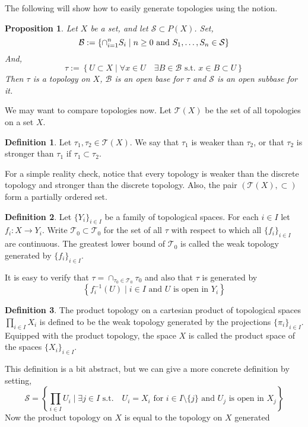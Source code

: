 \documentclass[11pt,a4paper]{article}
\theoremstyle{definition}
\newtheorem{definition}{Definition}[section]
\theoremstyle{plain}
\newtheorem{proposition}[theorem]{Proposition}
\newcommand{\st}{\text{ s.t. }}
\newcommand{\set}[2]{ \left\{ #1 \mid #2 \right\} }
\begin{document}
	The following will show how to easily generate topologies using the notion.
	\begin{proposition}
		Let $X$ be a set, and let $\mathcal{S} \subset P(X)$. Set,
		\[
			\mathcal{B} := \set{\cap_{i=1}^{n}{S_i}}{n \geq 0 \textnormal{ and }
			S_1,\dots,S_n \in \mathcal{S}}
		\]
		And,
		\[
			\tau := \set{U \subset X}{\forall x \in U \quad \exists B \in 
			\mathcal{B} \st x \in B \subset U}
		\]
		Then $\tau$ is a topology on $X$, $\mathcal{B}$ is an open base for 
		$\tau$ and $\mathcal{S}$ is an open subbase for it.
	\end{proposition}
	We may want to compare topologies now. Let $\mathcal{T}(X)$ be the set of
	all topologies on a set $X$.
	\begin{definition}
		Let $\tau_1,\tau_2 \in \mathcal{T}(X)$. We say that $\tau_1$ is weaker
		than $\tau_2$, or that $\tau_2$ is stronger than $\tau_1$ if 
		$\tau_1 \subset \tau_2$.
	\end{definition}
	For a simple reality check, notice that every topology is weaker than the
	discrete topology and stronger than the discrete topology. Also, the
	pair $(\mathcal{T}(X), \subset)$ form a partially ordered set.
	\begin{definition}
		Let $\{Y_i\}_{i \in I}$ be a family of topological spaces. For each
		$i \in I$ let $f_i \colon X \to Y_i$. Write $\mathcal{T}_0 \subset 
		\mathcal{T}_0$ for the set of all $\tau$ with respect to which all
		$\{f_i\}_{i \in I}$ are continuous. The greatest lower bound of 
		$\mathcal{T}_0$ is called the weak topology generated by 
		$\{f_i\}_{i \in I}$.
	\end{definition}
	It is easy to verify that $\tau = \cap_{\tau_0 \in \mathcal{T}_0}{\tau_0}$
	and also that $\tau$ is generated by 
	\[
		\set{f_i^{-1}(U)}{i \in I \text{ and $U$ is open in $Y_i$}}
	\]
	\begin{definition}
		The product topology on a cartesian product of topological spaces
		$\prod_{i \in I} X_i$ is defined to be the weak topology generated by
		the projections $\{\pi_i\}_{i \in I}$. Equipped with the product
		topology, the space $X$ is called the product space of the spaces
		$\{X_i\}_{i \in I}$.
	\end{definition}
	This definition is a bit abstract, but we can give a more concrete 
	definition by setting,
	\[
		\mathcal{S} = \set{\prod_{i \in I}{U_i}}{\exists j \in I \st 
		\text{ $U_i = X_i$ for $i \in I \setminus \{j\}$ and $U_j$ is open in
		$X_j$}}
	\]
	Now the product topology on $X$ is equal to the topology on $X$ generated
\end{document}
